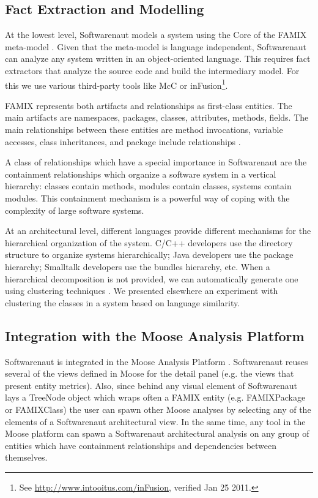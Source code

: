 \documentclass[preprint,12pt]{elsarticle}
\begin{document}
\subsection {Fact Extraction and Modelling} \label{sec:facts}

At the lowest level, Softwarenaut models a system using the Core of the FAMIX meta-model \cite{tichelaar-thesis}. Given that the meta-model is language independent, Softwarenaut can analyze any system written in an object-oriented language. This requires fact extractors that analyze the source code and build the intermediary model. For this we use various third-party tools like McC \cite{pepi-mcc} or inFusion\footnote{See \url{http://www.intooitus.com/inFusion}, verified Jan 25 2011.}.  

FAMIX represents both artifacts and relationships as first-class entities. The main artifacts are namespaces, packages, classes, attributes, methods, fields. The main relationships between these entities are method invocations, variable accesses, class inheritances, and package include relationships \cite{tichelaar-thesis}.

A class of relationships which have a special importance in Softwarenaut are the containment relationships which organize a software system in a vertical hierarchy: classes contain methods, modules contain classes, systems contain modules. This containment mechanism is a powerful way of coping with the complexity of large software systems.

At an architectural level, different languages provide different mechanisms for the hierarchical organization of the system. C/C++ developers use the directory structure to organize systems hierarchically; Java developers use the package hierarchy; Smalltalk developers use the bundles hierarchy, etc. 
When a hierarchical decomposition is not provided, we can automatically generate one using clustering techniques \cite{koschke-thesis}. We presented elsewhere an experiment with clustering the classes in a system based on language similarity\cite{Lung05a}.

\subsection {Integration with the Moose Analysis Platform}


Softwarenaut is integrated in the Moose Analysis Platform \cite{nier-story}. Softwarenaut reuses several of the views defined in Moose for the detail panel (e.g. the views that present entity metrics). Also, since behind any visual element of Softwarenaut lays a TreeNode object which wraps often a FAMIX entity (e.g. FAMIXPackage or FAMIXClass) the user can spawn other Moose analyses by selecting any of the elements of a Softwarenaut architectural view. In the same time, any tool in the Moose platform can spawn a Softwarenaut architectural analysis on any group of entities which have containment relationships and dependencies between themselves.
\end{document}
